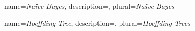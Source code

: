 
{
  name=\textit{Na{\"i}ve Bayes},
  description={},
  plural=\textit{Na{\"i}ve Bayes}
}

{
  name=\textit{Hoeffding Tree},
  description={},
  plural=\textit{Hoeffding Trees}
}












